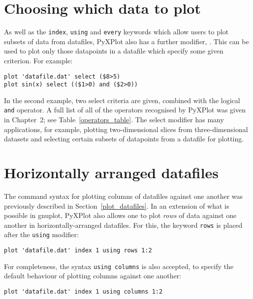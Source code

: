 \section{Choosing which data to plot}
\label{select_modifier} 
As well as the {\tt index}, {\tt using} and {\tt every} keywords which allow
users to plot subsets of data from datafiles, PyXPlot also has a further
modifier, . This can be used to plot only those datapoints in a
datafile which specify some given criterion. For example:

\begin{verbatim}
plot 'datafile.dat' select ($8>5)
plot sin(x) select (($1>0) and ($2>0))
\end{verbatim}

In the second example, two select criteria are given, combined with the logical
{\tt and} operator. A full list of all of the operators recognised by PyXPlot
was given in Chapter~2; see Table~\ref{operators_table}.  The select modifier
has many applications, for example, plotting two-dimensional slices from
three-dimensional datasets and selecting certain subsets of datapoints from a
datafile for plotting.

\section{Horizontally arranged datafiles}

\label{horizontal_datafiles} The command syntax for plotting
columns of datafiles against one another was previously described in
Section~\ref{plot_datafiles}.  In an extension of what is possible in gnuplot,
PyXPlot also allows one to plot {\it rows} of data against one another in
horizontally-arranged datafiles.  For this, the keyword {\tt rows} is placed
after the {\tt using} modifier:

\begin{verbatim}
plot 'datafile.dat' index 1 using rows 1:2
\end{verbatim}

\noindent For completeness, the syntax {\tt using columns} is also
accepted, to specify the default behaviour of plotting columns against one
another:

\begin{verbatim}
plot 'datafile.dat' index 1 using columns 1:2
\end{verbatim}


